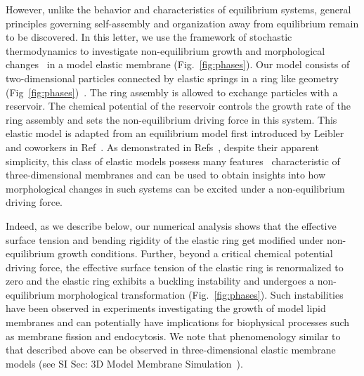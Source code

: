 \documentclass[amsmath,preprintnumbers,10pt,nofootinbib,prl,twocolumn]{revtex4-1}
\begin{document}
However, unlike the behavior and characteristics of equilibrium systems, general principles governing self-assembly and organization away from equilibrium remain to be discovered. In this letter, we use the framework of stochastic thermodynamics to investigate non-equilibrium growth and morphological changes~\cite{Drasdo2000, Ramaswamy2000,Rao2001,Solon2006,Hannezo2011,Fisher1989,Fisher1989a,Rudnick1991,Rajesh2008,Nelson2009,Mahadevan2019,Wolde2019} in a model elastic membrane (Fig.~\ref{fig:phases}). Our model consists of two-dimensional particles connected by elastic springs in a ring like geometry (Fig~\ref{fig:phases})~\cite{Fisher1989,Fisher1989a,Rudnick1991,Rajesh2008,Nelson2009}. The ring assembly is allowed to exchange particles with a reservoir. The chemical potential of the reservoir controls the growth rate of the ring assembly and sets the non-equilibrium driving force in this system. This elastic model is adapted from an equilibrium model first introduced by Leibler and coworkers in Ref~\cite{Fisher1989}. As demonstrated in Refs~\cite{Fisher1989,Fisher1989a,Rudnick1991,Rajesh2008,Nelson2009}, despite their apparent simplicity, this class of elastic models possess many features~\cite{W.Helfrich1973,Fisher1989,Fisher1989a,Rudnick1991,Ramaswamy2000,Rao2001,Solon2006,Rajesh2008,Hannezo2011,Loubet2012,Nelson2009} characteristic of three-dimensional membranes and can be used to obtain insights into how morphological changes in such systems can be excited under a non-equilibrium driving force.

Indeed, as we describe below, our numerical analysis shows that the effective surface tension and bending rigidity of the elastic ring get modified under non-equilibrium growth conditions. Further, beyond a critical chemical potential driving force, the effective surface tension of the elastic ring is renormalized to zero and the elastic ring exhibits a buckling instability and undergoes a non-equilibrium morphological transformation (Fig.~\ref{fig:phases}). Such instabilities have been observed in experiments investigating the growth of model lipid membranes \cite{Solon2006} and can potentially have implications for biophysical processes such as membrane fission and endocytosis. We note that phenomenology similar to that described above can be observed in three-dimensional elastic membrane models (see SI Sec: 3D Model Membrane Simulation~\cite{Supplementary}).
\end{document}
